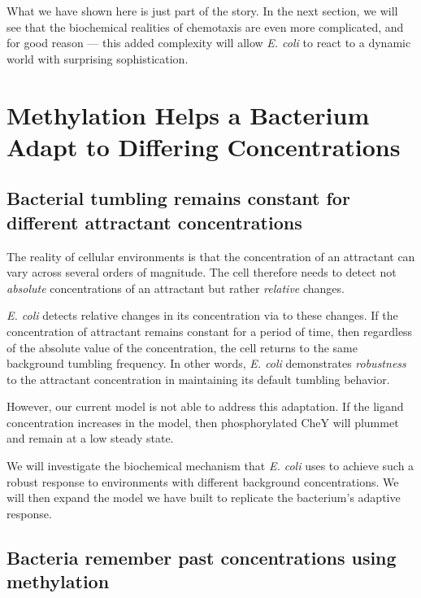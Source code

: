 What we have shown here is just part of the story. In the next section, we will see that the biochemical realities of chemotaxis are even more complicated, and for good reason --- this added complexity will allow \textit{E. coli} to react to a dynamic world with surprising sophistication.\\

\FloatBarrier
{}

\section{Methylation Helps a Bacterium Adapt to Differing Concentrations}
\label{sec:methylation}

\subsection{Bacterial tumbling remains constant for different attractant concentrations}

The reality of cellular environments is that the concentration of an attractant can vary across several orders of magnitude. The cell therefore needs to detect not \textit{absolute} concentrations of an attractant but rather \textit{relative} changes.

\textit{E. coli} detects relative changes in its concentration via  to these changes. If the concentration of attractant remains constant for a period of time, then regardless of the absolute value of the concentration, the cell returns to the same background tumbling frequency. In other words, \textit{E. coli} demonstrates \textit{robustness} to the attractant concentration in maintaining its default tumbling behavior.

However, our current model is not able to address this adaptation. If the ligand concentration increases in the model, then phosphorylated CheY will plummet and remain at a low steady state.

We will investigate the biochemical mechanism that \textit{E. coli} uses to achieve such a robust response to environments with different background concentrations. We will then expand the model we have built to replicate the bacterium's adaptive response.

\FloatBarrier
{}
\subsection{Bacteria remember past concentrations using methylation}


